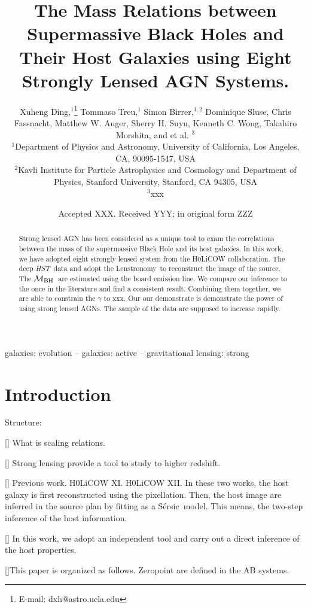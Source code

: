 \documentclass[fleqn,usenatbib]{mnras}
\title[Mass relations by lensed AGN hosts]{The Mass Relations between Supermassive Black Holes and Their Host Galaxies using Eight Strongly Lensed AGN Systems.}
\author[X. Ding et al.]{
Xuheng Ding,$^{1}$\thanks{E-mail: dxh@astro.ucla.edu}
Tommaso Treu,$^{1}$
Simon Birrer,$^{1, 2}$
Dominique Sluse,\newauthor
Chris Fassnacht,
Matthew W. Auger,
Sherry H. Suyu,
Kenneth C. Wong,\newauthor
Takahiro Morshita,
and et al. $^{3}$
\\
$^{1}$Department of Physics and Astronomy, University of California, Los Angeles, CA, 90095-1547, USA\\
$^{2}$Kavli Institute for Particle Astrophysics and Cosmology and Department of Physics, Stanford University, Stanford, CA 94305, USA\\
$^{3}$xxx
}
\date{Accepted XXX. Received YYY; in original form ZZZ}
\newcommand{\hst}{{\it HST}}
\newcommand{\mbh}{$\mathcal M_{\rm BH}$}
\newcommand{\sersic}{S\'ersic}
\newcommand{\lenstronomy}{{\sc Lenstronomy}}
\begin{document}
\label{firstpage}
\pagerange{\pageref{firstpage}--\pageref{lastpage}}
\maketitle

\begin{abstract}
Strong lensed AGN has been considered as a unique tool to exam the correlations between the mass of the supermassive Black Hole and its host galaxies. In this work, we have adopted eight strongly lensed system from the H0LiCOW collaboration. The deep \hst\ data and adopt the \lenstronomy\ to reconstruct the image of the source. The \mbh\ are estimated using the board emission line. We compare our inference to the once in the literature and find a consistent result. Combining them together, we are able to constrain the $\gamma$ to xxx. Our our demonstrate is demonstrate the power of using strong lensed AGNs. The sample of the data are supposed to increase rapidly.
\end{abstract}

\begin{keywords}
galaxies: evolution -- galaxies: active -- gravitational lensing: strong
\end{keywords}



\section{Introduction}
Structure:

[] What is scaling relations.

[] Strong lensing provide a tool to study to higher redshift.

[] Previous work. H0LiCOW XI. H0LiCOW XII. In these two works, the host galaxy is first reconstructed using the pixellation. Then, the host image are inferred in the source plan by fitting as a \sersic\ model. This means, the two-step inference of the host information. 

[] In this work, we adopt an independent tool and carry out a direct inference of the host properties. 

[]This paper is organized as follows. Zeropoint are defined in the AB systems.
\end{document}
